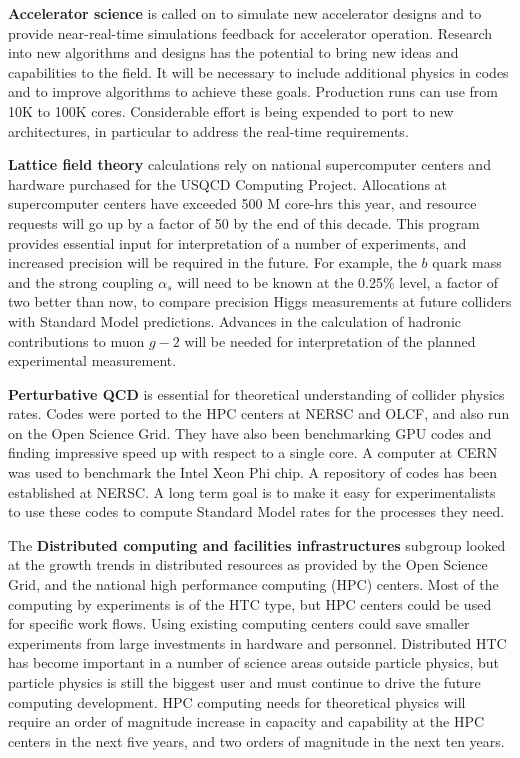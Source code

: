 {\bf Accelerator science} is called on to simulate new accelerator designs
and to provide near-real-time simulations feedback for accelerator
operation. 
Research into new algorithms and designs has the potential to bring new ideas and
capabilities to the field.
It will be necessary to include additional physics in codes and
to improve algorithms to achieve these goals. Production runs can use from
10K to 100K cores. Considerable effort is being expended to port to new
architectures, in particular to address the real-time requirements.

{\bf Lattice field theory} calculations rely on national supercomputer
centers and hardware purchased for the USQCD Computing Project. Allocations
at supercomputer centers have exceeded 500 M core-hrs this year, and
resource requests will go up by a factor of 50 by the end of this decade.
This program provides essential input for interpretation of a number of
experiments, and increased precision will be required in the future. For
example, the $b$ quark mass and the strong coupling $\alpha_s$ will need to
be known at the 0.25\% level, a factor of two better than now, to compare
precision Higgs measurements at future colliders with 
Standard Model predictions.  Advances
in the calculation of hadronic contributions to muon $g-2$ will be needed
for interpretation of the planned experimental measurement.

{\bf Perturbative QCD} is essential for theoretical understanding of
collider physics rates. Codes were ported to the HPC centers at NERSC and
OLCF, and also run on the Open Science Grid. They have also been
benchmarking GPU codes and finding impressive speed up with respect to
 a single core.
A computer at CERN was used to benchmark the Intel Xeon Phi chip.
A repository of codes has been established at NERSC.  A long term goal is
to make it easy for experimentalists to use these codes to compute Standard
Model rates for the processes they need.

The {\bf Distributed computing and facilities infrastructures} subgroup
looked at the growth trends in distributed resources as provided by the
Open Science Grid, and the national high performance computing (HPC)
centers. Most of the computing by experiments is of the HTC type, but HPC
centers could be used for specific work flows. Using existing computing
centers could save smaller experiments from large investments in hardware
and personnel. Distributed HTC has become important in a number of science
areas outside particle physics, but particle physics is still the 
biggest user and must continue to
drive the future computing development. HPC computing needs for theoretical
physics will require an order of magnitude increase in capacity and
capability at the HPC centers in the next five years, and two orders of
magnitude in the next ten years.

